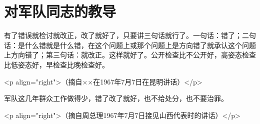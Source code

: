 \section[对军队同志的教导（一九六七年七月）]{对军队同志的教导}


有了错误就检讨就改正，改了就好了，只要讲三句话就行了。一句话：错了；二句话：是什么错就是什么错，在这个问题上或那个问题上是方向错了就承认这个问题上方向错了；第三句话：就改正。这样就好了。公开检查比不公开好，高姿态检查比低姿态好，早检查比晚检查好。

<p align="right">（摘自××在1967年7月7日在昆明讲话）</p>

军队这几年群众工作做得少，错了改了就好，也不给处分，也不要治罪。

<p align="right">（摘自周总理1967年7月7日接见山西代表时的讲话）</p>


